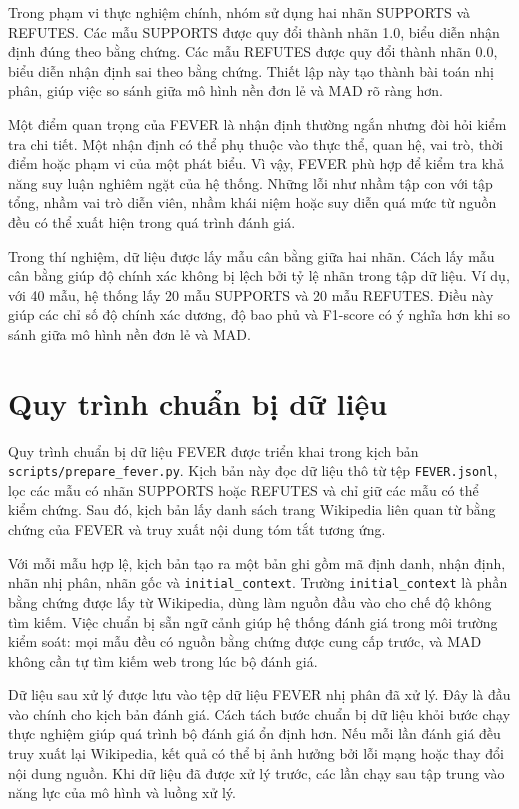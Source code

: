 ﻿\documentclass[oneside,a4paper,12pt]{extreport}
\begin{document}
Trong phạm vi thực nghiệm chính, nhóm sử dụng hai nhãn SUPPORTS và REFUTES. Các mẫu SUPPORTS được quy đổi thành nhãn 1.0, biểu diễn nhận định đúng theo bằng chứng. Các mẫu REFUTES được quy đổi thành nhãn 0.0, biểu diễn nhận định sai theo bằng chứng. Thiết lập này tạo thành bài toán nhị phân, giúp việc so sánh giữa mô hình nền đơn lẻ và MAD rõ ràng hơn.

Một điểm quan trọng của FEVER là nhận định thường ngắn nhưng đòi hỏi kiểm tra chi tiết. Một nhận định có thể phụ thuộc vào thực thể, quan hệ, vai trò, thời điểm hoặc phạm vi của một phát biểu. Vì vậy, FEVER phù hợp để kiểm tra khả năng suy luận nghiêm ngặt của hệ thống. Những lỗi như nhầm tập con với tập tổng, nhầm vai trò diễn viên, nhầm khái niệm hoặc suy diễn quá mức từ nguồn đều có thể xuất hiện trong quá trình đánh giá.

Trong thí nghiệm, dữ liệu được lấy mẫu cân bằng giữa hai nhãn. Cách lấy mẫu cân bằng giúp độ chính xác không bị lệch bởi tỷ lệ nhãn trong tập dữ liệu. Ví dụ, với 40 mẫu, hệ thống lấy 20 mẫu SUPPORTS và 20 mẫu REFUTES. Điều này giúp các chỉ số độ chính xác dương, độ bao phủ và F1-score có ý nghĩa hơn khi so sánh giữa mô hình nền đơn lẻ và MAD.

\section{Quy trình chuẩn bị dữ liệu}

Quy trình chuẩn bị dữ liệu FEVER được triển khai trong kịch bản \texttt{scripts/prepare\_fever.py}. Kịch bản này đọc dữ liệu thô từ tệp \texttt{FEVER.jsonl}, lọc các mẫu có nhãn SUPPORTS hoặc REFUTES và chỉ giữ các mẫu có thể kiểm chứng. Sau đó, kịch bản lấy danh sách trang Wikipedia liên quan từ bằng chứng của FEVER và truy xuất nội dung tóm tắt tương ứng.

Với mỗi mẫu hợp lệ, kịch bản tạo ra một bản ghi gồm mã định danh, nhận định, nhãn nhị phân, nhãn gốc và \texttt{initial\_context}. Trường \texttt{initial\_context} là phần bằng chứng được lấy từ Wikipedia, dùng làm nguồn đầu vào cho chế độ không tìm kiếm. Việc chuẩn bị sẵn ngữ cảnh giúp hệ thống đánh giá trong môi trường kiểm soát: mọi mẫu đều có nguồn bằng chứng được cung cấp trước, và MAD không cần tự tìm kiếm web trong lúc bộ đánh giá.

Dữ liệu sau xử lý được lưu vào tệp dữ liệu FEVER nhị phân đã xử lý. Đây là đầu vào chính cho kịch bản đánh giá. Cách tách bước chuẩn bị dữ liệu khỏi bước chạy thực nghiệm giúp quá trình bộ đánh giá ổn định hơn. Nếu mỗi lần đánh giá đều truy xuất lại Wikipedia, kết quả có thể bị ảnh hưởng bởi lỗi mạng hoặc thay đổi nội dung nguồn. Khi dữ liệu đã được xử lý trước, các lần chạy sau tập trung vào năng lực của mô hình và luồng xử lý.
\end{document}
